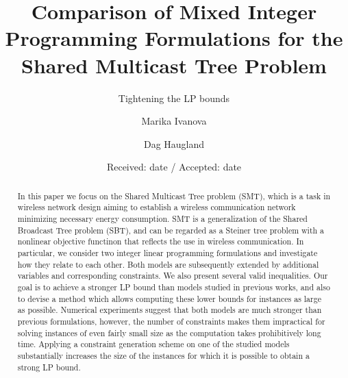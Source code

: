 \documentclass[smallextended]{svjour3}       %
\begin{document}
\title{Comparison of Mixed Integer Programming Formulations for the Shared Multicast Tree Problem
}
\subtitle{Tightening the LP bounds}

\author{Marika Ivanova        \and
         Dag Haugland
}


\date{Received: date / Accepted: date}
\maketitle

\begin{abstract}
In this paper we focus on the Shared Multicast Tree problem (SMT), which is 
a task in wireless network design aiming to establish a wireless 
communication network minimizing necessary energy consumption. SMT is a 
generalization of the Shared Broadcast Tree problem (SBT), and can be 
regarded as a Steiner tree problem with a nonlinear objective functinon that
reflects the use in wireless communication. In particular, we consider two 
integer linear programming formulations and investigate how they relate to 
each other.  Both models are subsequently extended by additional variables and corresponding constraints. We also present several valid inequalities. Our goal is to achieve a stronger LP bound than models studied in previous works, and also to devise 
a method which allows computing these lower bounds for instances as 
large as possible. Numerical experiments suggest that both models are much 
stronger than previous formulations, however, the number of constraints 
makes them impractical for solving instances of even fairly small size as 
the computation takes prohibitively long time. Applying a constraint 
generation scheme on one of the studied models substantially increases the 
size of the instances for which it is possible to obtain a strong LP 
bound. 
\end{abstract}
\end{document}
